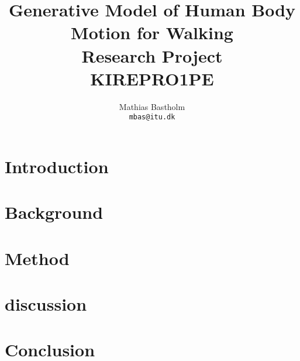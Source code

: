 \documentclass{article}
\title{%
    Generative Model of Human Body Motion for Walking\\
    \large Research Project\\
    \small KIREPRO1PE
}
\author{%
    Mathias Bastholm\\
    \texttt{mbas@itu.dk}
}
\begin{document}
\maketitle

\section{Introduction}\label{sec:introduction}


\section{Background}\label{sec:background}


\section{Method}\label{sec:method}


\section{discussion}\label{sec:discussion}


\section{Conclusion}\label{sec:conclusion}


\newpage
\printbibliography%
\end{document}
